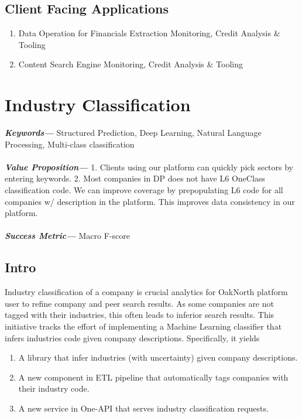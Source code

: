 \documentclass[]{article}
\providecommand{\keywords}[1]{\textbf{\textit{Keywords---}} #1}
\providecommand{\values}[1]{\textbf{\textit{Value Proposition---}} #1}
\providecommand{\successmetric}[1]{\textbf{\textit{Success Metric---}} #1}
\begin{document}
\subsection{Client Facing Applications}
\begin{enumerate}
    \item Data Operation for Financials Extraction \textrightarrow Monitoring, 
    Credit Analysis \& Tooling
    \item Content Search Engine \textrightarrow Monitoring, Credit Analysis \& 
    Tooling
\end{enumerate}

\newpage


\section{Industry Classification}
\keywords{Structured Prediction, Deep Learning, Natural Language Processing, 
Multi-class classification}
\\\\
\noindent
\values{1. Clients using our platform can quickly pick sectors by entering 
keywords.  2. Most companies in DP does not have L6 OneClass classification 
code. We can improve coverage by prepopulating L6 code for all companies w/ 
description in the platform. This improves data consistency in our platform.}
\\\\
\noindent
\successmetric{Macro F-score}

\subsection{Intro}
Industry classification of a company is crucial analytics for OakNorth platform 
user to refine company and peer search results. As some companies are not 
tagged with their industries, this often leads to inferior search results. This 
initiative tracks the effort of implementing a Machine Learning classifier that 
infers industries code given company descriptions. Specifically, it yields

\begin{enumerate}
    \item A library that infer industries (with uncertainty) given company 
    descriptions.
    \item A new component in ETL pipeline that automatically tags companies 
    with their industry code.
    \item A new service in One-API that serves industry classification requests.
\end{enumerate}
\end{document}
